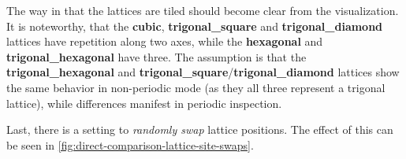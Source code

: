 The way in that the lattices are tiled should become clear from the visualization.
It is noteworthy, that the \textbf{cubic}, \textbf{trigonal\_square} and \textbf{trigonal\_diamond} lattices have repetition along two axes, while the \textbf{hexagonal} and \textbf{trigonal\_hexagonal} have three. 
The assumption is that the \textbf{trigonal\_hexagonal} and \textbf{trigonal\_square}/\textbf{trigonal\_diamond} lattices show the same behavior in non-periodic mode (as they all three represent a trigonal lattice), while differences manifest in periodic inspection.

Last, there is a setting to \emph{randomly swap} lattice positions. 
The effect of this can be seen in \autoref{fig:direct-comparison-lattice-site-swaps}.

\begin{figure}[htbp]
    \centering


\end{figure}
